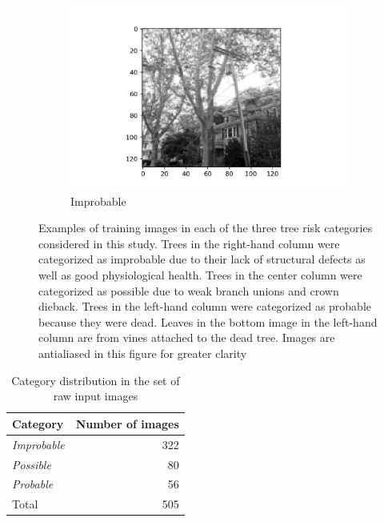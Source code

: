 \documentclass[Journal,letterpaper, SingleSpace, InsideFigs]{ascelike-new}
\begin{document}
\begin{figure}[ht]
\begin{subfigure}[t]{.325\linewidth}
    \includegraphics[width=\textwidth,keepaspectratio=true,angle=-90]{improbable-example-2}
    \caption{Improbable}
  \end{subfigure}
  \caption{Examples of training images in each of the three tree risk categories considered in this study.
  Trees in the right-hand column were categorized as improbable due to their lack of structural defects as well as good physiological health. Trees in the center column were categorized as possible due to weak branch unions and crown dieback. Trees in the left-hand column were categorized as probable because they were dead. Leaves in the bottom image in the left-hand column are from vines attached to the dead tree. Images are antialiased in this figure for greater clarity}
  \label{fig:raw_images}
\end{figure}

\begin{table}[h!]\small
    \centering
    \begin{tabular}{l r}\toprule
    \bf Category     & \bf Number of images  \\ \midrule
    \textit{Improbable} & 322\\
    \textit{Possible} & 80 \\
    \textit{Probable} & 56 \\\midrule
    Total & 505 \\\bottomrule
    \end{tabular}
    \caption{Category distribution  in the set of raw input images}
    \label{tab:classdist}
\end{table}
\end{document}
